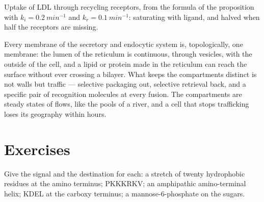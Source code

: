 \begin{omfigure}

{\small Uptake of LDL through recycling receptors, from the formula of
the proposition with $k_{i} = \qty{0.2}{min^{-1}}$ and $k_{r} =
\qty{0.1}{min^{-1}}$: saturating with ligand, and halved when half the
receptors are missing.}
\end{omfigure}

\begin{remark}\label{rem:b3:membrane-traffic:one-membrane}
Every membrane of the secretory and endocytic system is, topologically,
one membrane: the lumen of the reticulum is continuous, through
vesicles, with the outside of the cell, and a lipid or protein made in
the reticulum can reach the surface without ever crossing a bilayer.
What keeps the compartments distinct is not walls but traffic ---
selective packaging out, selective retrieval back, and a specific pair
of recognition molecules at every fusion. The compartments are steady
states of flows, like the pools of a river, and a cell that stops
trafficking loses its geography within hours.
\end{remark}

\section{Exercises}

\begin{exercise}[$\star$]\label{exo:b3:membrane-traffic:1}
Give the signal and the destination for each: a stretch of twenty
hydrophobic residues at the amino terminus; PKKKRKV; an amphipathic
amino-terminal helix; KDEL at the carboxy terminus; a
mannose-6-phosphate on the sugars.
\end{exercise}

